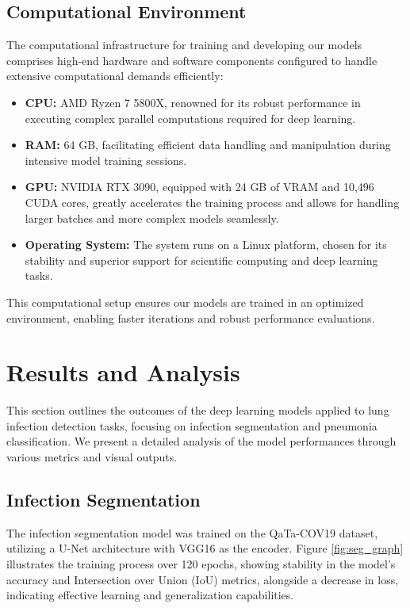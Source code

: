\documentclass[10pt]{article}
\begin{document}
\subsection{Computational Environment}
The computational infrastructure for training and developing our models comprises high-end hardware and software components configured to handle extensive computational demands efficiently:

\begin{itemize}
    \item \textbf{CPU:} AMD Ryzen 7 5800X, renowned for its robust performance in executing complex parallel computations required for deep learning.
    \item \textbf{RAM:} 64 GB, facilitating efficient data handling and manipulation during intensive model training sessions.
    \item \textbf{GPU:} NVIDIA RTX 3090, equipped with 24 GB of VRAM and 10,496 CUDA cores, greatly accelerates the training process and allows for handling larger batches and more complex models seamlessly.
    \item \textbf{Operating System:} The system runs on a Linux platform, chosen for its stability and superior support for scientific computing and deep learning tasks.
\end{itemize}

This computational setup ensures our models are trained in an optimized environment, enabling faster iterations and robust performance evaluations.

\section{Results and Analysis}

This section outlines the outcomes of the deep learning models applied to lung infection detection tasks, focusing on infection segmentation and pneumonia classification. We present a detailed analysis of the model performances through various metrics and visual outputs.

\subsection{Infection Segmentation}
The infection segmentation model was trained on the QaTa-COV19 dataset, utilizing a U-Net architecture with VGG16 as the encoder. Figure \ref{fig:seg_graph} illustrates the training process over 120 epochs, showing stability in the model's accuracy and Intersection over Union (IoU) metrics, alongside a decrease in loss, indicating effective learning and generalization capabilities.
\end{document}
